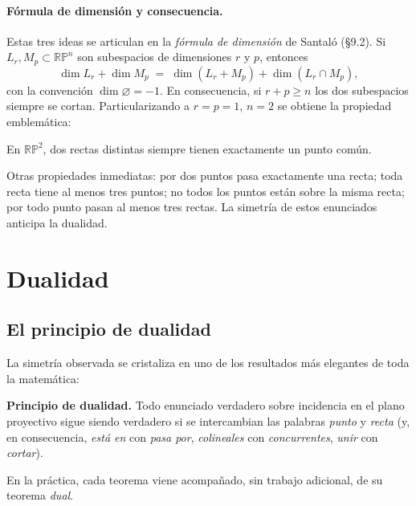 \documentclass[11pt,a4paper]{article}
\newcommand{\RP}{\mathbb{RP}}
\begin{document}
\paragraph{Fórmula de dimensión y consecuencia.}
Estas tres ideas se articulan en la \emph{fórmula de dimensión} de
Santaló (§9.2). Si $L_r,M_p\subset\RP^n$ son subespacios de dimensiones
$r$ y $p$, entonces
\[
  \dim L_r + \dim M_p \;=\; \dim(L_r+M_p)+\dim(L_r\cap M_p),
\]
con la convención $\dim\varnothing=-1$. En consecuencia, si $r+p\ge n$
los dos subespacios siempre se cortan. Particularizando a $r=p=1$,
$n=2$ se obtiene la propiedad emblemática:
\begin{teorema}
\centering\large
En $\RP^2$, dos rectas distintas siempre tienen exactamente un punto común.
\end{teorema}
Otras propiedades inmediatas: por dos puntos pasa exactamente una recta;
toda recta tiene al menos tres puntos; no todos los puntos están sobre la
misma recta; por todo punto pasan al menos tres rectas. La simetría de
estos enunciados anticipa la dualidad.

\section{Dualidad}

\subsection{El principio de dualidad}

La simetría observada se cristaliza en uno de los resultados más elegantes
de toda la matemática:

\begin{teorema}
\textbf{Principio de dualidad.} Todo enunciado verdadero sobre incidencia
en el plano proyectivo sigue siendo verdadero si se intercambian las
palabras \emph{punto} y \emph{recta} (y, en consecuencia, \emph{está en}
con \emph{pasa por}, \emph{colineales} con \emph{concurrentes},
\emph{unir} con \emph{cortar}).
\end{teorema}

\noindent En la práctica, cada teorema viene acompañado, sin trabajo
adicional, de su teorema \emph{dual}.
\end{document}
